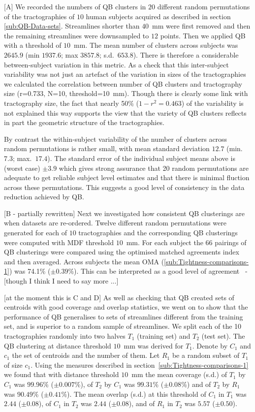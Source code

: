 \documentclass{bioinfo}
\begin{document}
[A] We recorded the numbers of QB clusters in $20$ different random
permutations of the tractographies of $10$ human subjects acquired as
described in section \ref{sub:QB-Data-sets}. Streamlines shorter than
$40$~mm were first removed and then the remaining streamlines were
downsampled to $12$ points. Then we applied QB with a threshold of
$10$~mm. The mean number of clusters across subjects was $2645.9$ (min
$1937.6$; max $3857.8$; s.d.~$653.8$). There is therefore a considerable
between-subject variation in this metric.  As a check that this
inter-subject variability was not just an artefact of the variation in
sizes of the tractographies we calculated the correlation between number
of QB clusters and tractography size (r=0.733, N=10, threshold=10~mm).
Though there is clearly some link with tractography size, the fact that
nearly 50\% ($1-r^2=0.463$) of the variability is not explained this way
supports the view that the variety of QB clusters reflects in part the
geometric structure of the tractographies.

By contrast the within-subject variability of the number of clusters
across random permutations is rather small, with mean standard deviation
$12.7$ (min.~$7.3$; max.~$17.4$). The standard error of the individual
subject means above is (worst case) $\pm 3.9$ which gives strong
assurance that 20 random permutations are adequate to get reliable
subject level estimates and that there is minimal fluction across these
permutations. This suggests a good level of consistency in the data
reduction achieved by QB.

[B - partially rewritten] Next we investigated how consistent QB
clusterings are when datasets are re-ordered. Twelve different random
permutations were generated for each of $10$ tractographies and the
corresponding QB clusterings were computed with MDF threshold
$10$~mm. For each subject the $66$ pairings of QB clusterings were
compared using the optimised matched agreements index and then
averaged. Across subjects the mean OMA
(\ref{sub:Tightness-comparisons-1}) was 74.1\% ($\pm 0.39$\%). This can
be interpreted as a good level of agreement~\citep{altman1995} - [though
I think I need to say more ...]

[at the moment this is C and D] As well as checking that QB created sets
of centroids with good coverage and overlap statistics, we went on to
show that the performance of QB generalises to sets of streamlines
different from the training set, and is superior to a random sample of
streamlines. We split each of the 10 tractographies randomly into two
halves $T_1$ (training set) and $T_2$ (test set). The QB clustering at
distance threshold $10$~mm was derived for $T_1$. Denote by $C_1$ and
$c_1$ the set of centroids and the number of them. Let $R_1$ be a random
subset of $T_1$ of size $c_1$. Using the measures described in
section~\ref{sub:Tightness-comparisons-1} we found that with distance
threshold $10$~mm the mean coverage (s.d.) of $T_1$ by $C_1$ was
$99.96$\% ($\pm 0.007$\%), of $T_2$ by $C_1$ was $99.31$\% ($\pm
0.08$\%) and of $T_2$ by $R_1$ was $90.49$\% ($\pm 0.41$\%). The mean
overlap (s.d.) at this threshold of $C_1$ in $T_1$ was $2.44$ ($\pm
0.08$), of $C_1$ in $T_2$ was $2.44$ ($\pm 0.08$), and of $R_1$ in $T_2$
was $5.57$ ($\pm 0.50$).
\end{document}
